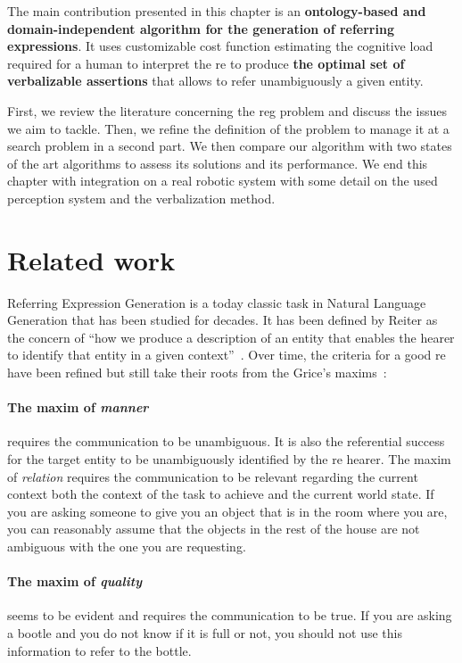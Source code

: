 The main contribution presented in this chapter is an \textbf{ontology-based and domain-independent algorithm for the generation of referring expressions}. It uses customizable cost function estimating the cognitive load required for a human to interpret the \acrshort{re} to produce \textbf{the optimal set of verbalizable assertions} that allows to refer unambiguously a given entity.

First, we review the literature concerning the \acrshort{reg} problem and discuss the issues we aim to tackle. Then, we refine the definition of the problem to manage it at a search problem in a second part. We then compare our algorithm with two states of the art algorithms to assess its solutions and its performance. We end this chapter with integration on a real robotic system with some detail on the used perception system and the verbalization method.

\section{Related work}

Referring Expression Generation is a today classic task in Natural Language Generation \cite{gatt_2018_survey} that has been studied for decades. It has been defined by Reiter as the concern of ``how we produce a description of an entity that enables the hearer to identify that entity in a given context''~\cite{reiter_2000_building}. Over time, the criteria for a good \acrfull{re} have been refined but still take their roots from the Grice's maxims~\cite{grice_1975_logic}:

\paragraph{The maxim of \textit{manner}} requires the communication to be unambiguous. It is also the referential success for the target entity to be unambiguously identified by the \acrshort{re} hearer. The maxim of \textit{relation} requires the communication to be relevant regarding the current context both the context of the task to achieve and the current world state. If you are asking someone to give you an object that is in the room where you are, you can reasonably assume that the objects in the rest of the house are not ambiguous with the one you are requesting. 

\paragraph{The maxim of \textit{quality}} seems to be evident and requires the communication to be true. If you are asking a bootle and you do not know if it is full or not, you should not use this information to refer to the bottle. 

